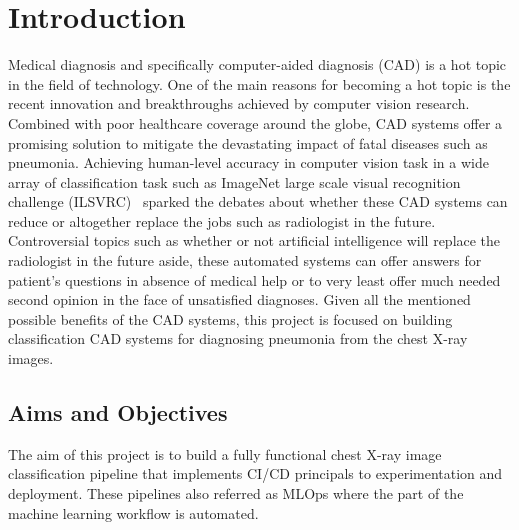 \chapter{Introduction} \label{chap:introduction}

Medical diagnosis and specifically computer-aided diagnosis (CAD) is a hot topic in the field of technology. One of the main reasons for becoming a hot topic is the recent innovation and breakthroughs achieved by computer vision research. Combined with poor healthcare coverage around the globe, CAD systems offer a promising solution to mitigate the devastating impact of fatal diseases such as pneumonia. Achieving human-level accuracy in computer vision task in a wide array of classification task such as ImageNet large scale visual recognition challenge (ILSVRC)~\cite{imagenet} sparked the debates about whether these CAD systems can reduce or altogether replace the jobs such as radiologist in the future.
Controversial topics such as whether or not artificial intelligence will replace the radiologist in the future aside, these automated systems can offer answers for patient's questions in absence of medical help or to very least offer much needed second opinion in the face of unsatisfied diagnoses. Given all the mentioned possible benefits of the CAD systems, this project is focused on building classification CAD systems for diagnosing pneumonia from the chest X-ray images.

\section{Aims and Objectives} \label{sec:aimsandobj}
The aim of this project is to build a fully functional chest X-ray image classification pipeline that implements CI/CD principals to experimentation and deployment.
These pipelines also referred as MLOps where the part of the machine learning workflow is automated.

